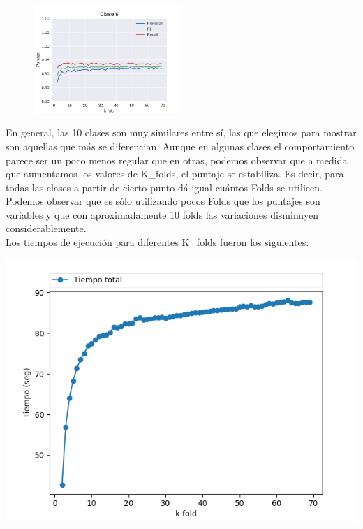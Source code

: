 \begin{figure}[H]
{    \includegraphics[width=0.5\textwidth]{informe/imagenes/kfold/knn/clase9.pdf}}

\end{figure}

En general, las 10 clases son muy similares entre sí, las que elegimos para mostrar son aquellas que más se diferencian. Aunque en algunas clases el comportamiento parece ser un poco menos regular que en otras, podemos observar que a medida que aumentamos los valores de K_folds, el puntaje se estabiliza. Es decir, para todas las clases a partir de cierto punto dá igual cuántos Folds se utilicen. Podemos observar que es sólo utilizando pocos Folds que los puntajes son variables y que con aproximadamente 10 folds las variaciones disminuyen considerablemente.\\

Los tiempos de ejecución para diferentes K_folds fueron los siguientes:

{\centering
    \includegraphics[scale=0.8]{informe/imagenes/kfold/knn/tiempokfold.png} \\
}
$ $\newline

